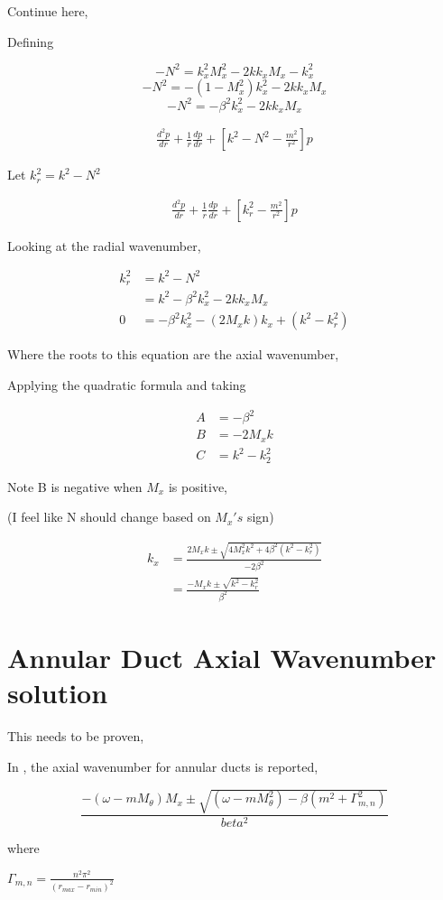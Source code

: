 \documentclass[a4paper]{article}
\begin{document}
Continue here,


Defining 

$$- N^2 = k_x^2 M_x^2 - 2 k k_x M_x - k_x^2 $$
$$-N^2 = -(1 -  M_x^2)k_x^2 - 2 k k_x M_x  $$
$$-N^2 =  -\beta^2 k_x^2 - 2 k k_x M_x  $$


\begin{align*}
    \frac{ d^2 p}{d r} +
    \frac{1}{r} 
    \frac{d p}{d r} + \left[ 
    k^2 - N^2 - \frac{m^2}{r^2}  \right]p 
\end{align*}

Let $k_r^2 = k^2 - N^2$


\begin{align*}
    \frac{ d^2 p}{d r} +
    \frac{1}{r} 
    \frac{d p}{d r} + \left[ 
    k_r^2  - \frac{m^2}{r^2}  \right]p 
\end{align*}

Looking at the radial wavenumber,

\begin{align*}
    k_r^2 &= k^2 - N^2 \\
          &= k^2-\beta^2 k_x^2 - 2 k k_x M_x \\
    0 &=  -\beta ^2 k_x ^2 -  \left( 2M_x k \right)k_x +(k^2 - k_r^2)
\end{align*}

Where the roots to this equation are the axial wavenumber,


Applying the quadratic formula and taking 

\begin{align*}
    A &= - \beta^2 \\
    B &= - 2M_x k\\
    C &= k^2 - k_2^2
\end{align*} 

Note B is negative when $M_x$ is positive,

(I feel like N should change based on $M_x's$ sign)

\begin{align*}
    k_x &= \frac{2M_x k \pm \sqrt{4 M_x^2 k^2 + 4 \beta^2 \left( k^2 - k_r^2 \right)}}{-2\beta^2}\\
        &= \frac{-M_x k \pm \sqrt{k^2 - k_r^2}}{\beta^2}
\end{align*}

\section{Annular Duct Axial Wavenumber solution}



This needs to be proven,


In \cite{Amr2001}, the axial wavenumber for annular ducts is reported,

\begin{equation*}
    \frac{-(\omega - m M_{\theta})M_x \pm \sqrt{\left( \omega - m M_{\theta}^2 \right) - \beta\left( m^2 + \Gamma_{m,n} ^2 \right)}}{beta^2}
\end{equation*}

where 

$\Gamma_{m,n}= \frac{n^2 \pi^2}{\left( r_{max} - r_{min} \right)^2}$



\end{document}
